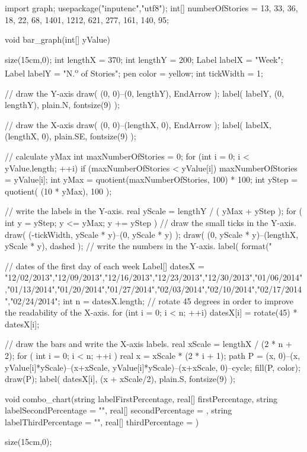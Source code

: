 \begin{asydef}
import graph;
usepackage("inputenc","utf8");
int[] numberOfStories = {13, 33, 36, 18, 22, 68, 1401, 1212, 621, 277, 161, 140, 95};

void bar_graph(int[] yValue){
  size(15cm,0);
  int lengthX = 370;
  int lengthY = 200;
  Label labelX = "Week";
  Label labelY = "N.\textsuperscript{o} of Stories";
  pen color = yellow;
  int tickWidth = 1;

  // draw the Y-axis
  draw( (0, 0)--(0, lengthY), EndArrow );
  label( labelY, (0, lengthY), plain.N,  fontsize(9) );

  // draw the X-axis
  draw( (0, 0)--(lengthX, 0), EndArrow );
  label( labelX, (lengthX, 0), plain.SE, fontsize(9) );

  // calculate yMax
  int maxNumberOfStories = 0;
  for (int i = 0; i < yValue.length; ++i)
  	if (maxNumberOfStories < yValue[i])
  		maxNumberOfStories = yValue[i];
  int yMax = quotient(maxNumberOfStories, 100) * 100;
  int yStep = quotient( (10 * yMax), 100 );

  // write the labels in the Y-axis.
  real yScale = lengthY / ( yMax + yStep );
  for ( int y = yStep; y <= yMax; y += yStep ) {
    // draw the small ticks in the Y-axis.
    draw( (-tickWidth, yScale * y)--(0, yScale * y) ); 
	draw( (0, yScale * y)--(lengthX, yScale * y), dashed );
    // write the numbers in the Y-axis.
    label( format("%
  }

  // dates of the first day of each week
  Label[] datesX = {"12/02/2013","12/09/2013","12/16/2013","12/23/2013","12/30/2013","01/06/2014","01/13/2014","01/20/2014","01/27/2014","02/03/2014","02/10/2014","02/17/2014","02/24/2014"};
  int n = datesX.length;
  // rotate 45 degrees in order to improve the readability of the X-axis.
  for (int i = 0; i < n; ++i)
    datesX[i] = rotate(45) * datesX[i];

  // draw the bars and write the X-axis labels.
  real xScale = lengthX / (2 * n + 2);
  for ( int i = 0; i < n; ++i ) { 
    real x = xScale * (2 * i + 1);
    path P = (x, 0)--(x, yValue[i]*yScale)--(x+xScale, yValue[i]*yScale)--(x+xScale, 0)--cycle;
    fill(P, color);
    draw(P);
    label( datesX[i], (x + xScale/2), plain.S, fontsize(9) );
  }
}

void combo_chart(string labelFirstPercentage,
                 real[] firstPercentage,
                 string labelSecondPercentage = "",
                 real[] secondPercentage = {},
                 string labelThirdPercentage = "",
                 real[] thirdPercentage = {}){
  size(15cm,0);
  
}
\end{asydef}
